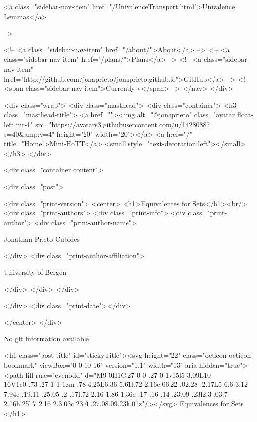       
    
      
        
          <a class="sidebar-nav-item" href="/UnivalenceTransport.html">Univalence Lemmas</a>
        
      
     -->

    <!-- <a class="sidebar-nav-item" href="/about/">About</a> -->
    <!-- <a class="sidebar-nav-item" href="/plans/">Plans</a> -->
    <!-- <a class="sidebar-nav-item" href="http://github.com/jonaprieto/jonaprieto.github.io">GitHub</a> -->
    <!-- <span class="sidebar-nav-item">Currently v</span> -->
  </nav>
</div>

    <div class="wrap">
      <div class="masthead">
        <div class="container">
          <h3 class="masthead-title">
            <a href=""><img alt="@jonaprieto" class="avatar float-left mr-1" src="https://avatars3.githubusercontent.com/u/1428088?s=40&amp;v=4" height="20" width="20"></a>
            <a href="/" title="Home">Mini-HoTT</a>
            <small style="text-decoration:left"></small>
          </h3>
        </div>
      
      <div class="container content">
        







<div class="post">

  <div class="print-version">
    <center>
      <h1>Equivalences for Sets</h1><br/>
        <div class="print-authors">
          <div class="print-info">
            <div class="print-author">
              <div class="print-author-name">
                
                  Jonathan Prieto-Cubides
                
              </div>
              <div class="print-author-affiliation">
                
                  University of Bergen
                
                </div>
            </div>
          </div>
          
          
        </div>
        <div class="print-date"></div>
        
        
    </center>
  </div>

  
  No git information available.
  
  <h1 class="post-title" id="stickyTitle"><svg height="22" class="octicon octicon-bookmark" viewBox="0 0 10 16" version="1.1" width="13" aria-hidden="true"><path fill-rule="evenodd" d="M9 0H1C.27 0 0 .27 0 1v15l5-3.09L10 16V1c0-.73-.27-1-1-1zm-.78 4.25L6.36 5.61l.72 2.16c.06.22-.02.28-.2.17L5 6.6 3.12 7.94c-.19.11-.25.05-.2-.17l.72-2.16-1.86-1.36c-.17-.16-.14-.23.09-.23l2.3-.03.7-2.16h.25l.7 2.16 2.3.03c.23 0 .27.08.09.23h.01z"/></svg> Equivalences for Sets
  </h1>

